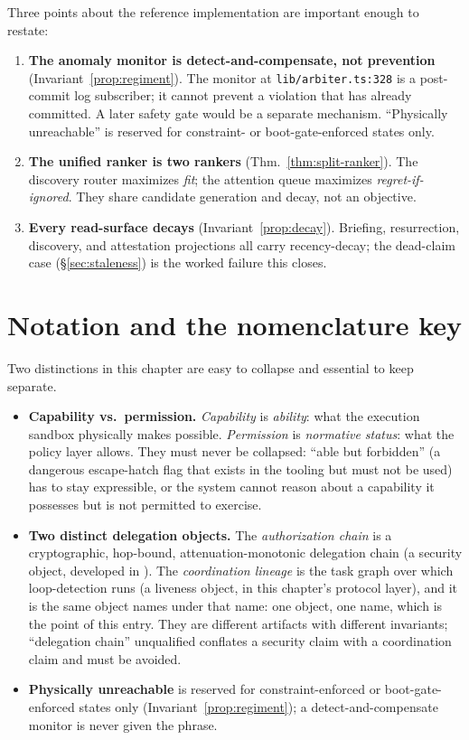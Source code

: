 \documentclass[11pt,a4paper]{article}
\theoremstyle{definition}
\theoremstyle{plain}
\newcounter{protocol}[section]
\begin{document}
Three points about the reference implementation are important enough to restate:
\begin{enumerate}[leftmargin=1.5em]
\item \textbf{The anomaly monitor is detect-and-compensate, not prevention}
(Invariant~\ref{prop:regiment}). The monitor at \texttt{lib/arbiter.ts:328} is a
post-commit log subscriber; it cannot prevent a violation that has already
committed. A later safety gate would be a separate mechanism. ``Physically unreachable'' is reserved for constraint- or boot-gate-enforced
states only.
\item \textbf{The unified ranker is two rankers} (Thm.~\ref{thm:split-ranker}). The
discovery router maximizes \emph{fit}; the attention queue maximizes
\emph{regret-if-ignored}. They share candidate generation and decay, not an objective.
\item \textbf{Every read-surface decays} (Invariant~\ref{prop:decay}). Briefing,
resurrection, discovery, and attestation projections all carry recency-decay; the
dead-claim case (\S\ref{sec:staleness}) is the worked failure this closes.
\end{enumerate}

\section{Notation and the nomenclature key}\label{app:notation}

Two distinctions in this chapter are easy to collapse and essential to keep separate.

\begin{itemize}[leftmargin=1.4em]
\item \textbf{Capability vs.\ permission.} \emph{Capability} is \emph{ability}: what
the execution sandbox physically makes possible. \emph{Permission} is \emph{normative
status}: what the policy layer allows. They must never be collapsed: ``able but
forbidden'' (a dangerous escape-hatch flag that exists in the tooling but must not be
used) has to stay expressible, or the system cannot reason about a capability it
possesses but is not permitted to exercise.
\item \textbf{Two distinct delegation objects.} The \emph{authorization chain} is a
cryptographic, hop-bound, attenuation-monotonic delegation chain (a security object,
developed in ). The \emph{coordination lineage} is the
task graph over which loop-detection runs (a liveness object, in this chapter's
protocol layer), and it is the same object 
names under that name: one object, one name, which is the point of this entry.
They are different artifacts with different invariants; ``delegation
chain'' unqualified conflates a security claim with a coordination claim and must be
avoided.
\item \textbf{Physically unreachable} is reserved for constraint-enforced or
boot-gate-enforced states only (Invariant~\ref{prop:regiment}); a detect-and-compensate
monitor is never given the phrase.
\end{itemize}
\end{document}
